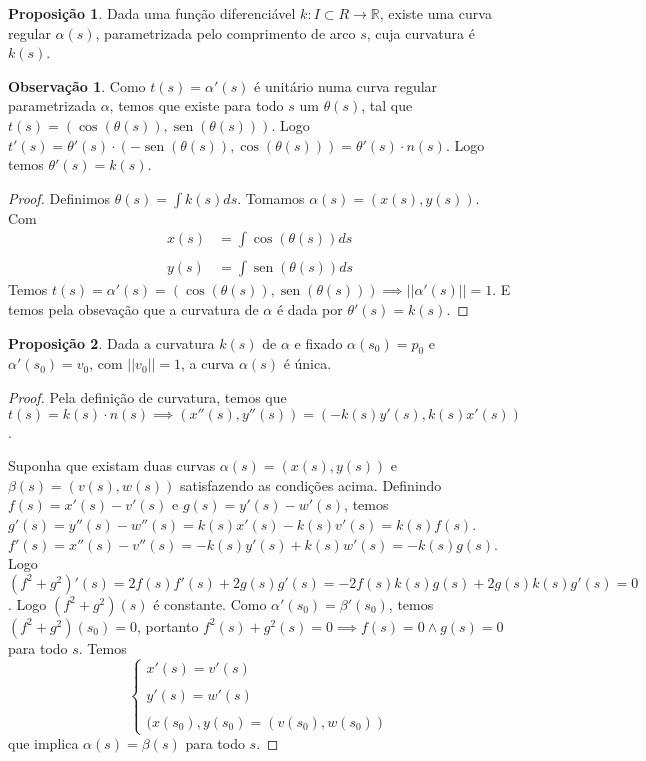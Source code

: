 \documentclass[12pt,leqno,twoside]{amsart}
\theoremstyle{definition}
\newtheorem{proposicao}{Proposição}[section]
\newtheorem*{obs}{Observação}
\newcommand{\sen}{\operatorname{sen}}
\begin{document}
	\begin{proposicao}
		Dada uma função diferenciável $k:I \subset R \to \mathbb{R}$, existe uma curva regular $\alpha(s)$, parametrizada pelo comprimento de arco $s$, cuja curvatura é $k(s)$.

	\end{proposicao}
	\begin{obs}
		Como $ t(s) = \alpha'(s)$ é unitário numa curva regular parametrizada $\alpha$, temos que existe para todo $s$ um $\theta(s)$, tal que $t(s) = (\cos(\theta(s)), \sen(\theta(s)))$. Logo $t'(s) = \theta'(s) \cdot(-\sen(\theta(s)), \cos(\theta(s))) = \theta'(s) \cdot n(s)$. Logo temos $\theta'(s) = k(s)$.
	\end{obs}
	\begin{proof}
		Definimos $\theta(s) = \displaystyle \int k(s) ds$. Tomamos $\alpha(s) = (x(s), y(s))$. Com \begin{align*}
			x(s) &= \int \cos( \theta(s))ds  \\~\\
			y(s) &= \int \sen(\theta(s))ds
		\end{align*}
		Temos $ t(s) = \alpha'(s) = (\cos(\theta(s)), \sen(\theta(s))) \implies ||\alpha'(s)|| = 1$.  E temos pela obsevação que a curvatura de $\alpha$ é dada por $\theta'(s) = k(s)$.
	\end{proof}
	\begin{proposicao}
		Dada a curvatura $k(s)$ de $\alpha$ e fixado $\alpha(s_0) = p_0$ e $\alpha'(s_0) = v_0$, com $||v_0|| = 1$, a curva $\alpha(s)$ é única.
	\end{proposicao}
	\begin{proof}
		Pela definição de curvatura, temos que $t(s) = k(s) \cdot n(s) \implies (x''(s),y''(s)) = ( -k(s)y'(s), k(s)x'(s))$.

		Suponha que existam duas curvas $\alpha(s) = (x(s), y(s))$ e $\beta(s) = (v(s), w(s))$ satisfazendo as condições acima. Definindo $f(s) = x'(s) -v'(s)$ e $g(s) = y'(s) - w'(s)$, temos $g'(s) = y''(s) - w''(s) = k(s)x'(s) -k(s)v'(s) = k(s)f(s)$. $ f'(s) =  x''(s) - v''(s) = -k(s)y'(s) +k(s)w'(s) = -k(s)g(s) $. Logo $\left(f^{2} +g^{2} \right)'(s)  = 2f(s)f'(s) +2 g(s)g'(s) = -2f(s)k(s)g(s) +2g(s)k(s)g'(s) = 0$. Logo $\left(f^2+g^2\right)(s)$ é constante. Como $\alpha'(s_0) = \beta'(s_0)$, temos $\left(f^2+g^2\right)(s_0) = 0$, portanto $f^2(s)+g^2(s) =0 \implies f(s) = 0 \land g(s) = 0$ para todo $s$.  Temos $$\begin{cases}
			x'(s) = v'(s) \\~\\
			y'(s) = w'(s)\\~\\
			(x(s_0), y(s_0) = (v(s_0), w(s_0))
		\end{cases}$$
		que implica $\alpha(s) = \beta(s)$ para todo $s$.
	\end{proof}
\end{document}
